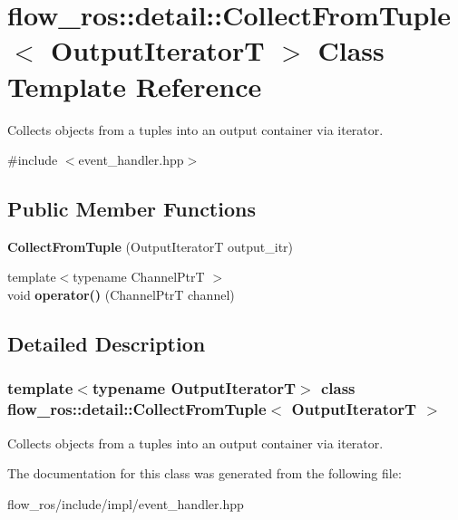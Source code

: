 \hypertarget{classflow__ros_1_1detail_1_1_collect_from_tuple}{}\section{flow\+\_\+ros\+:\+:detail\+:\+:Collect\+From\+Tuple$<$ Output\+IteratorT $>$ Class Template Reference}
\label{classflow__ros_1_1detail_1_1_collect_from_tuple}


Collects objects from a tuples into an output container via iterator.  




{\ttfamily \#include $<$event\+\_\+handler.\+hpp$>$}

\subsection*{Public Member Functions}
\begin{DoxyCompactItemize}
\item 
\mbox{\label{classflow__ros_1_1detail_1_1_collect_from_tuple_a91d23020033dc73749a5575333b8f021}} 
{\bfseries Collect\+From\+Tuple} (Output\+IteratorT output\+\_\+itr)
\item 
\mbox{\label{classflow__ros_1_1detail_1_1_collect_from_tuple_a10e163b928e05c78f2164f99bdb3cbad}} 
{\footnotesize template$<$typename Channel\+PtrT $>$ }\\void {\bfseries operator()} (Channel\+PtrT channel)
\end{DoxyCompactItemize}


\subsection{Detailed Description}
\subsubsection*{template$<$typename Output\+IteratorT$>$\newline
class flow\+\_\+ros\+::detail\+::\+Collect\+From\+Tuple$<$ Output\+Iterator\+T $>$}

Collects objects from a tuples into an output container via iterator. 

The documentation for this class was generated from the following file\+:\begin{DoxyCompactItemize}
\item 
flow\+\_\+ros/include/impl/event\+\_\+handler.\+hpp\end{DoxyCompactItemize}
